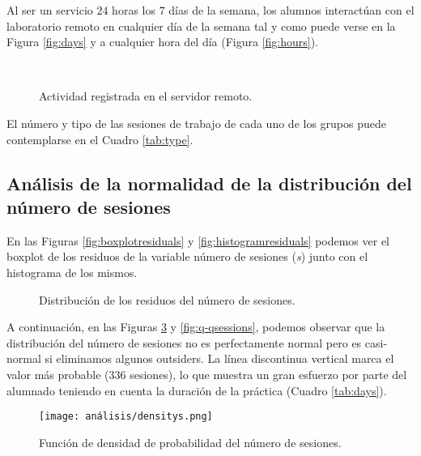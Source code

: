 Al ser un servicio $24$ horas los $7$ días de la semana, los alumnos interactúan con el laboratorio remoto en cualquier día de la semana tal y como puede verse en la Figura \ref{fig:days} y a cualquier hora del día (Figura \ref{fig:hours}).

\begin{figure}[H]
\centering
{}\\
\caption{Actividad registrada en el servidor remoto.}
\label{fig:activity}
\end{figure}

El número y tipo de las sesiones de trabajo de cada uno de los grupos puede contemplarse en el Cuadro \ref{tab:type}.

\subsection{Análisis de la normalidad de la distribución del número de sesiones}\label{sec:NormalityNumSessions}

En las Figuras \ref{fig:boxplotresiduals} y \ref{fig:histogramresiduals} podemos ver el boxplot de los residuos de la variable número de sesiones (\emph{s}) junto con el histograma de los mismos.

\begin{figure}[H]
\centering
{}\qquad
{}
\caption{Distribución de los residuos del número de sesiones.}
\label{fig:activity}
\end{figure}

A continuación, en las Figuras \ref{fig:densitysessions} y \ref{fig:q-qsessions}, podemos observar que la distribución del número de sesiones no es perfectamente normal pero es casi-normal si eliminamos algunos outsiders. La línea discontinua vertical marca el valor más probable ($336$ sesiones), lo que muestra un gran esfuerzo por parte del alumnado teniendo en cuenta la duración de la práctica (Cuadro \ref{tab:days}).

\begin{figure}[H]
    \centering
    \texttt{[image: análisis/densitys.png]}
    \caption{Función de densidad de probabilidad del número de sesiones.}
    \label{fig:densitysessions}
\end{figure}


